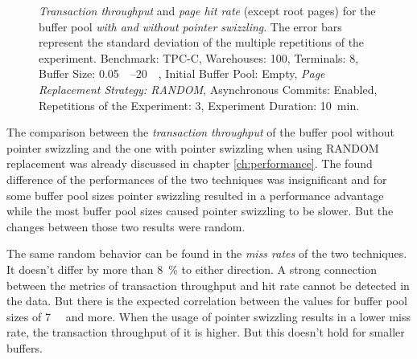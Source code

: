 \begin{@empty}
\begin{figure}[ht!]
{
		}
		\caption{\emph{Transaction throughput} and \emph{page hit rate} (except root pages) for the buffer pool \emph{with and without pointer swizzling}. The error bars represent the standard deviation of the multiple repetitions of the experiment. Benchmark: TPC-C, Warehouses: 100, Terminals: 8, Buffer Size: \SIrange{0.05}{20}{\gibi\byte}, Initial Buffer Pool: Empty, \emph{Page Replacement Strategy: RANDOM}, Asynchronous Commits: Enabled, Repetitions of the Experiment: 3, Experiment Duration: \SI{10}{\minute}.}
		\label{fig:latchedpagereplacement}
	\end{figure}
\end{@empty}

	The comparison between the \emph{transaction throughput} of the buffer pool without pointer swizzling and the one with pointer swizzling when using RANDOM replacement was already discussed in chapter \ref{ch:performance}. The found difference of the performances of the two techniques was insignificant and for some buffer pool sizes pointer swizzling resulted in a performance advantage while the most buffer pool sizes caused pointer swizzling to be slower. But the changes between those two results were random.
	
	The same random behavior can be found in the \emph{miss rates} of the two techniques. It doesn't differ by more than \SI{8}{\percent} to either direction. A strong connection between the metrics of transaction throughput and hit rate cannot be detected in the data. But there is the expected correlation between the values for buffer pool sizes of \SI{7}{\gibi\byte} and more. When the usage of pointer swizzling results in a lower miss rate, the transaction throughput of it is higher. But this doesn't hold for smaller buffers.
	
